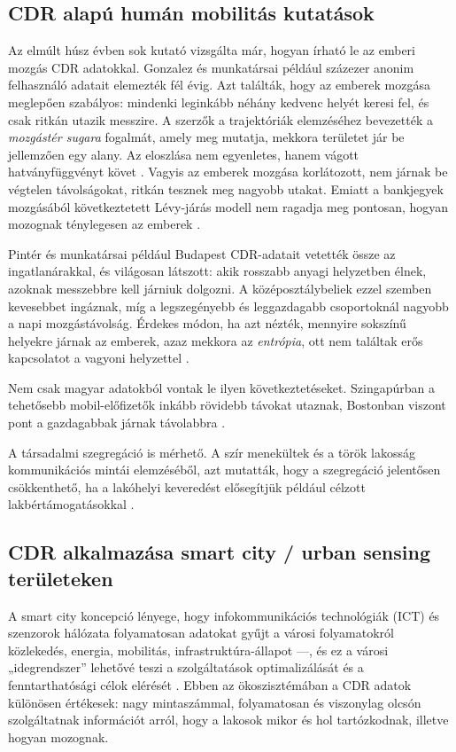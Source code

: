 \subsection{CDR alapú humán mobilitás kutatások}
Az elmúlt húsz évben sok kutató vizsgálta már, hogyan írható le az emberi mozgás CDR adatokkal. Gonzalez és munkatársai például százezer anonim felhasználó adatait elemezték fél évig. Azt találták, hogy az emberek mozgása meglepően szabályos: mindenki leginkább néhány kedvenc helyét keresi fel, és csak ritkán utazik messzire.  
A szerzők a trajektóriák elemzéséhez bevezették a \emph{mozgástér sugara} fogalmát, amely meg mutatja, mekkora területet jár be jellemzően egy alany. Az eloszlása nem egyenletes, hanem vágott hatványfüggvényt követ . Vagyis az emberek mozgása korlátozott, nem járnak be végtelen távolságokat, ritkán tesznek meg nagyobb utakat. Emiatt a bankjegyek mozgásából következtetett Lévy-járás modell nem ragadja meg pontosan, hogyan mozognak ténylegesen az emberek \cite{gonzalez2008understanding}.

Pintér és munkatársai például Budapest CDR-adatait vetették össze az ingatlanárakkal, és világosan látszott: akik rosszabb anyagi helyzetben élnek, azoknak messzebbre kell járniuk dolgozni. A középosztálybeliek ezzel szemben kevesebbet ingáznak, míg a legszegényebb és leggazdagabb csoportoknál nagyobb a napi mozgástávolság. Érdekes módon, ha azt nézték, mennyire sokszínű helyekre járnak az emberek, azaz mekkora az \emph{entrópia}, ott nem találtak erős kapcsolatot a vagyoni helyzettel \cite{pinter2021evaluating}.

Nem csak magyar adatokból vontak le ilyen következtetéseket. Szingapúrban a tehetősebb mobil-előfizetők inkább rövidebb távokat utaznak, Bostonban viszont pont a gazdagabbak járnak távolabbra \cite{pinter2021evaluating}.

A társadalmi szegregáció is mérhető. A szír menekültek és a török lakosság kommunikációs mintái elemzéséből, azt mutatták, hogy a szegregáció jelentősen csökkenthető, ha a lakóhelyi keveredést elősegítjük például célzott lakbértámogatásokkal \cite{rhoads2020measuring}.


\subsection{CDR alkalmazása smart city / urban sensing területeken}

A smart city koncepció lényege, hogy infokommunikációs technológiák (ICT) és szenzorok hálózata folyamatosan adatokat gyűjt a városi folyamatokról közlekedés, energia, mobilitás, infrastruktúra-állapot ---, és ez a városi „idegrendszer” lehetővé teszi a szolgáltatások optimalizálását és a fenntarthatósági célok elérését \cite{batty2012smart}. Ebben az ökoszisztémában a CDR adatok különösen értékesek: nagy mintaszámmal, folyamatosan és viszonylag olcsón szolgáltatnak információt arról, hogy a lakosok mikor és hol tartózkodnak, illetve hogyan mozognak.

